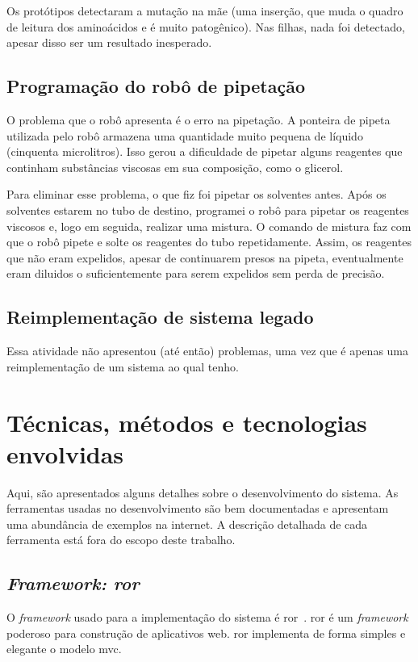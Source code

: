 Os protótipos detectaram a mutação na mãe (uma inserção, que muda o quadro de leitura dos aminoácidos e é muito patogênico). Nas filhas, nada foi detectado,
apesar disso ser um resultado inesperado.

\subsection{Programação do robô de pipetação}

O problema que o robô apresenta é o erro na pipetação. A ponteira de pipeta utilizada pelo robô armazena uma quantidade muito pequena de líquido (cinquenta
microlitros). Isso gerou a dificuldade de pipetar alguns reagentes que continham substâncias viscosas em sua composição, como o glicerol.

Para eliminar esse problema, o que fiz foi pipetar os solventes antes. Após os solventes estarem no tubo de destino, programei o robô para pipetar os
reagentes viscosos e, logo em seguida, realizar uma mistura. O comando de mistura faz com que o robô pipete e solte os reagentes do tubo repetidamente.
Assim, os reagentes que não eram expelidos, apesar de continuarem presos na pipeta, eventualmente eram diluidos o suficientemente para serem expelidos
sem perda de precisão.

\subsection{Reimplementação de sistema legado}

Essa atividade não apresentou (até então) problemas, uma vez que é apenas uma reimplementação de um sistema ao qual tenho.

\section{Técnicas, métodos e tecnologias envolvidas}

Aqui, são apresentados alguns detalhes sobre o desenvolvimento do sistema.
As ferramentas usadas no desenvolvimento são bem documentadas e apresentam uma abundância de
exemplos na internet. A descrição detalhada de cada ferramenta está fora do escopo deste trabalho.

\subsection{\textit{Framework: \gls{ror}}}

O \textit{framework} usado para a implementação do sistema é \gls{ror}~\cite{RoR}.
\gls{ror} é um \textit{framework} poderoso para construção de aplicativos web. \gls{ror} implementa de forma simples e elegante
o modelo \gls{mvc}.


